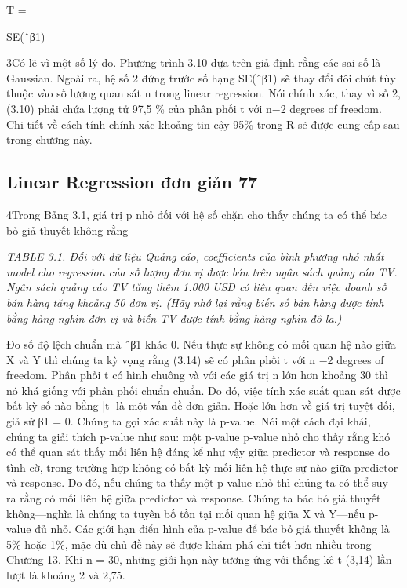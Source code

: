 T =

SE(ˆβ1)

3Có lẽ vì một số lý do. Phương trình 3.10 dựa trên giả định rằng các sai số là Gaussian. Ngoài ra, hệ số 2 đứng trước số hạng SE(ˆβ1) sẽ thay đổi đôi chút tùy thuộc vào số lượng quan sát n trong linear regression. Nói chính xác, thay vì số 2, (3.10) phải chứa lượng tử 97,5 \% của phân phối t với n−2 degrees of freedom. Chi tiết về cách tính chính xác khoảng tin cậy 95\% trong R sẽ được cung cấp sau trong chương này.

\subsection{Linear Regression đơn giản 77}

4Trong Bảng 3.1, giá trị p nhỏ đối với hệ số chặn cho thấy chúng ta có thể bác bỏ giả thuyết không rằng

\noindent\textit{TABLE 3.1. Đối với dữ liệu Quảng cáo, coefficients của bình phương nhỏ nhất model cho regression của số lượng đơn vị được bán trên ngân sách quảng cáo TV. Ngân sách quảng cáo TV tăng thêm 1.000 USD có liên quan đến việc doanh số bán hàng tăng khoảng 50 đơn vị. (Hãy nhớ lại rằng biến số bán hàng được tính bằng hàng nghìn đơn vị và biến TV được tính bằng hàng nghìn đô la.)}

Đo số độ lệch chuẩn mà ˆβ1 khác 0. Nếu thực sự không có mối quan hệ nào giữa X và Y thì chúng ta kỳ vọng rằng (3.14) sẽ có phân phối t với n −2 degrees of freedom. Phân phối t có hình chuông và với các giá trị n lớn hơn khoảng 30 thì nó khá giống với phân phối chuẩn chuẩn. Do đó, việc tính xác suất quan sát được bất kỳ số nào bằng |t| là một vấn đề đơn giản. Hoặc lớn hơn về giá trị tuyệt đối, giả sử β1 = 0. Chúng ta gọi xác suất này là p-value. Nói một cách đại khái, chúng ta giải thích p-value như sau: một p-value p-value nhỏ cho thấy rằng khó có thể quan sát thấy mối liên hệ đáng kể như vậy giữa predictor và response do tình cờ, trong trường hợp không có bất kỳ mối liên hệ thực sự nào giữa predictor và response. Do đó, nếu chúng ta thấy một p-value nhỏ thì chúng ta có thể suy ra rằng có mối liên hệ giữa predictor và response. Chúng ta bác bỏ giả thuyết không—nghĩa là chúng ta tuyên bố tồn tại mối quan hệ giữa X và Y—nếu p-value đủ nhỏ. Các giới hạn điển hình của p-value để bác bỏ giả thuyết không là 5\% hoặc 1\%, mặc dù chủ đề này sẽ được khám phá chi tiết hơn nhiều trong Chương 13. Khi n = 30, những giới hạn này tương ứng với thống kê t (3,14) lần lượt là khoảng 2 và 2,75.

